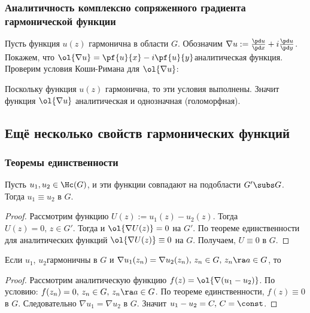 \documentclass[a4paper]{article}
\begin{document}
\begin{theorem}
\subsubsection{Аналитичность комплексно сопряженного градиента гармонической функции}

Пусть функция $u(z)$ гармонична в области $G$. Обозначим
$\nabla u :=\frac{\pd u}{\pd x}+i\frac{\pd u}{\pd y}$.
Покажем, что $\ol{\nabla u}=\pf{u}{x}-i \pf{u}{y}$\т аналитическая функция.
Проверим условия Коши-Римана для $\ol{\nabla u}$:

Поскольку функция $u(z)$ гармонична, то эти условия выполнены. Значит функция $\ol{\nabla u}$\т
аналитическая и однозначная (голоморфная).

\subsection{Ещё несколько свойств гармонических функций}

\subsubsection{Теоремы единственности}

\begin{theorem}[1]
Пусть $u_1,u_2\in \Hc(G)$, и эти функции совпадают на подобласти $G'\subs G$. Тогда $u_1\equiv u_2$ в $G$.
\end{theorem}
\begin{proof}
Рассмотрим функцию $U(z) :=u_1(z)-u_2(z)$. Тогда $U(z)=0,\,z\in G'$. Тогда и
$\ol{\nabla U(z)}=0$ на $G'$. По теореме единственности для аналитических функций
$\ol{\nabla U(z)}\equiv 0$ на $G$. Получаем, $U\equiv0$ в $G$.
\end{proof}

\begin{theorem}[2]
 Если $u_1$, $u_2$\т гармоничны в $G$ и
$\nabla u_1(z_n)=\nabla u_2(z_n), \, z_n\in G,\,z_n\ra a\in G$, то
\end{theorem}

\begin{proof}
Рассмотрим аналитическую функцию $f(z)=\ol{\nabla(u_1-u_2)}$. По условию: $f(z_n)=0,\,z_n\in
G,\,z_n\ra a\in G$. По теореме единственности, $f(z)\equiv0$ в $G$. Следовательно $\nabla
u_1=\nabla u_2$ в $G$. Значит $u_1-u_2=C,\,C=\const$.
\end{proof}


\end{theorem}
\end{document}
